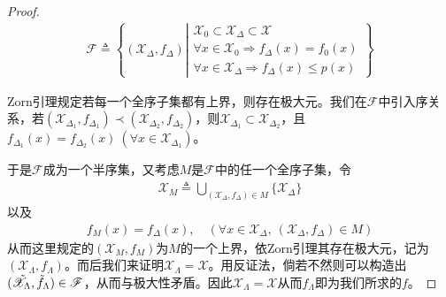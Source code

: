\begin{proof}
    \begin{align*}
        \mathscr{F} \triangleq \left\lbrace (\mathscr{X}_{\Delta}, f_{\Delta}) \left|
        \begin{array}{l}
            \mathscr{X}_0\subset \mathscr{X}_{\Delta} \subset \mathscr{X} \\
            \forall x\in\mathscr{X}_0\Rightarrow f_{\Delta}(x) = f_0(x) \\
            \forall x\in\mathscr{X}_{\Delta} \Rightarrow f_{\Delta}(x) \leqslant p(x)
        \end{array}
 \right.   \right\rbrace
    \end{align*}

    Zorn引理规定若每一个全序子集都有上界，则存在极大元。我们在$\mathscr{F}$中引入序关系，若$(\mathscr{X}_{\Delta_1},f_{\Delta_1})\prec (\mathscr{X}_{\Delta_2},f_{\Delta_2})$，则$\mathscr{X}_{\Delta_1}\subset \mathscr{X}_{\Delta_2}$，且$f_{\Delta_1}(x) = f_{\Delta_2}(x)\ (\forall x\in \mathscr{X}_{\Delta_1})$。

    于是$\mathscr{F}$成为一个半序集，又考虑$M$是$\mathscr{F}$中的任一个全序子集，令
    \begin{align*}
        \mathscr{X}_M \triangleq \bigcup\limits_{(\mathscr{X}_{\Delta},f_{\Delta})\in M} 
 \{\mathscr{X}_{\Delta}\}
    \end{align*}
    以及
    \begin{align*}
        f_M(x) = f_{\Delta}(x), \quad (\forall x\in\mathscr{X}_{\Delta},\ (\mathscr{X}_{\Delta}, f_{\Delta})\in M)
    \end{align*}
    从而这里规定的$(\mathscr{X}_M,f_M)$为$M$的一个上界，依Zorn引理其存在极大元，记为$(\mathscr{X}_{\Lambda}, f_{\Lambda})$。而后我们来证明$\mathscr{X}_{\Lambda} = \mathscr{X}$。用反证法，倘若不然则可以构造出$(\Tilde{\mathscr{X}}_{\Lambda}, \Tilde{f}_{\Lambda})\in \mathscr{F}$，从而与极大性矛盾。因此$\mathscr{X}_{\Lambda} = \mathscr{X}$从而$f_{\Lambda}$即为我们所求的$f$。
\end{proof}

